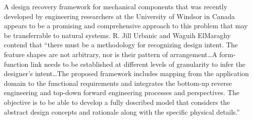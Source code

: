 A design recovery framework for mechanical components that was recently
developed by engineering researchers at the University of Windsor in
Canada appears to be a promising and comprehensive approach to this
problem that may be transferrable to natural systems. R. Jill Urbanic
and Waguih ElMaraghy contend that “there must be a methodology for
recognizing design intent. The feature shapes are not arbitrary, nor is
their pattern of arrangement…A form-function link needs to be
established at different levels of granularity to infer the designer’s
intent…The proposed framework includes mapping from the application
domain to the functional requirements and integrates the bottom-up
reverse engineering and top-down forward engineering processes and
perspectives. The objective is to be able to develop a fully described
model that considers the abstract design concepts and rationale along
with the specific physical details.”\citep{urbanicelmaraghy2009}

